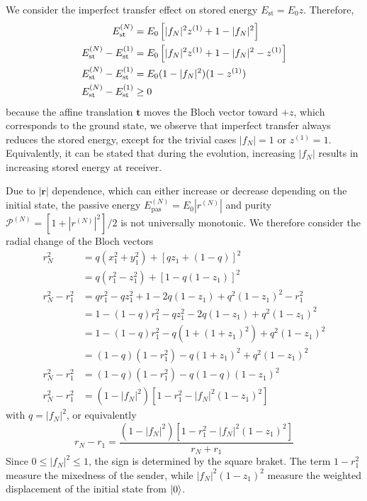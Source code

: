 \documentclass[../../../main.tex]{subfiles}
\begin{document}
We consider the imperfect transfer effect on stored energy $E_\mathrm{st} = E_0z$.
Therefore,
\begin{align*}
  E_{\rm st}^{(N)}
                                    & =  E_0 \left[ |f_N|^2z^{(1)} + 1-|f_N|^2 \right]       \\
  E_{\rm st}^{(N)}-E_{\rm st}^{(1)}
                                    & = E_0 \left[ |f_N|^2z^{(1)} +1-|f_N|^2-z^{(1)} \right] \\
  E_{\rm st}^{(N)}-E_{\rm st}^{(1)}
                                    & = E_0(1-|f_N|^2)(1-z^{(1)})                            \\
  E_{\rm st}^{(N)}-E_{\rm st}^{(1)} & \geq 0
\end{align*}
because the affine translation $\mathbf{t}$ moves the Bloch vector toward \(+z\), which corresponds to the ground state, we observe that  imperfect transfer always reduces the stored energy, except for the trivial cases \( |f_N|=1\) or \(z^{(1)}=1\).
Equivalently, it can be stated that during the evolution, increasing $|f_N|$ results in increasing  stored energy at receiver.

Due to $|\mathbf{r}|$ dependence, which can either increase or decrease depending on the initial state, the passive energy $E_\mathrm{pas}^{(N)} = E_0|r^{(N)}|$ and purity $\mathcal{P}^{(N)} = [1+|r^{(N)}|^2]/2$ is not universally monotonic.
We therefore consider the radial change of the Bloch vectors
\begin{align*}
  r_N^2
   & =  q(x_1^2+y_1^2)+[qz_1+(1-q)]^2                       \\
   & =  q(r_1^2-z_1^2)+[1-q(1-z_1)]^2                       \\
  r_N^2 -r_1^2
   & = qr_1^2-qz_1^2 + 1-2q(1-z_1) +q^2(1-z_1)^2-r_1^2      \\
   & = 1 - (1-q)r_1^2-qz_1^2 -2q(1-z_1) +q^2(1-z_1)^2       \\
   & = 1 - (1-q)r_1^2-q(1+(1+z_1)^2) +q^2(1-z_1)^2          \\
   & =  (1-q)(1-r_1^2)-q(1+z_1)^2 +q^2(1-z_1)^2             \\
  r_N^2-r_1^2
   & = (1-q)(1-r_1^2) - q(1-q)(1-z_1)^2                     \\
  r_N^2-r_1^2
   & =  (1-|f_N|^2)\left[ 1-r_1^2- |f_N|^2(1-z_1)^2 \right]
\end{align*}
with $q=|f_N|^2$, or equivalently
\begin{equation*}
  r_N-r_1 =
  \frac{  (1-|f_N|^2)\left[ 1-r_1^2- |f_N|^2(1-z_1)^2 \right]  }{r_N+r_1}
\end{equation*}
Since $0\leq |f_N|^2 \leq 1$, the sign is determined by the square braket.
The term $1-r_1^2$ measure the mixedness of the sender, while $|f_N|^2(1-z_1)^2$ measure the weighted displacement of the initial state from $\ket{0}$.
\end{document}
